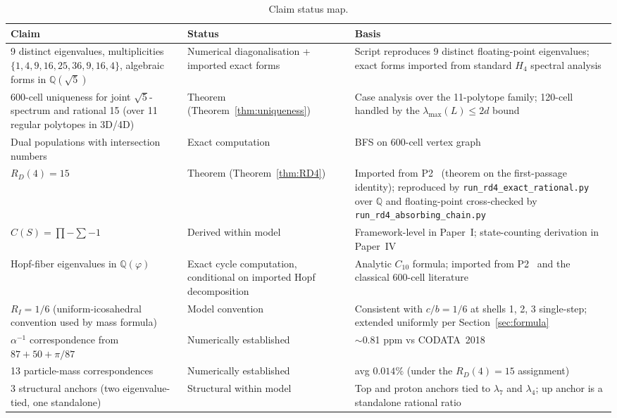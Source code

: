 \documentclass[12pt]{article}
\newcommand{\phig}{\varphi}
\begin{document}
\begin{table}[ht]
\centering
\caption{Claim status map.}
\label{tab:status}
\begin{tabular}{@{}lll@{}}
\toprule
Claim & Status & Basis \\
\midrule
9 distinct eigenvalues, multiplicities $\{1,4,9,16,25,36,9,16,4\}$, algebraic forms in $\mathbb{Q}(\sqrt{5})$ & Numerical diagonalisation + imported exact forms & Script reproduces 9 distinct floating-point eigenvalues; exact forms imported from standard $H_4$ spectral analysis~\citep{Coxeter1973} \\
600-cell uniqueness for joint $\sqrt{5}$-spectrum and rational 15 (over 11 regular polytopes in 3D/4D) & Theorem (Theorem~\ref{thm:uniqueness}) & Case analysis over the 11-polytope family; 120-cell handled by the $\lambda_{\max}(L) \leq 2d$ bound \\
Dual populations with intersection numbers & Exact computation & BFS on 600-cell vertex graph \\
$R_D(4) = 15$ & Theorem (Theorem~\ref{thm:RD4}) & Imported from P2~\citep{CascadeAlgSubstrate} (theorem on the first-passage identity); reproduced by \texttt{run\_rd4\_exact\_rational.py} over $\mathbb{Q}$ and floating-point cross-checked by \texttt{run\_rd4\_absorbing\_chain.py} \\
$C(S) = \prod - \sum - 1$ & Derived within model & Framework-level in Paper~I; state-counting derivation in Paper~IV \\
Hopf-fiber eigenvalues in $\mathbb{Q}(\phig)$ & Exact cycle computation, conditional on imported Hopf decomposition & Analytic $C_{10}$ formula; imported from P2~\citep{CascadeAlgSubstrate} and the classical 600-cell literature~\citep{Coxeter1973, DescHopf600} \\
$R_I = 1/6$ (uniform-icosahedral convention used by mass formula) & Model convention & Consistent with $c/b = 1/6$ at shells 1, 2, 3 single-step; extended uniformly per Section~\ref{sec:formula} \\
$\alpha^{-1}$ correspondence from $87 + 50 + \pi/87$ & Numerically established & $\sim$0.81 ppm vs CODATA~2018 \\
13 particle-mass correspondences & Numerically established & avg $0.014\%$ (under the $R_D(4)=15$ assignment) \\
3 structural anchors (two eigenvalue-tied, one standalone) & Structural within model & Top and proton anchors tied to $\lambda_7$ and $\lambda_4$; up anchor is a standalone rational ratio \\

\end{tabular}
\end{table}
\end{document}
